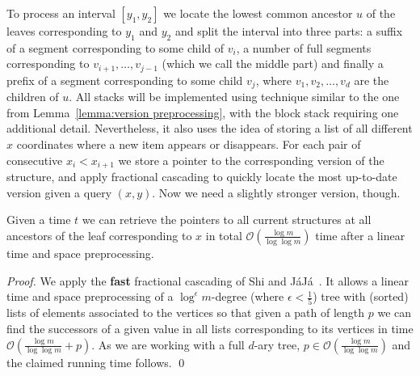 \documentclass[runningheads]{llncs}
\begin{document}
To process an interval $[y_{1},y_{2}]$ we locate the lowest common ancestor $u$ of the leaves corresponding to $y_{1}$ and $y_{2}$ and split the interval into three parts: a suffix of a segment corresponding to some child of $v_{i}$, a number of full segments corresponding to $v_{i+1},\ldots,v_{j-1}$ (which we call the middle part) and finally a prefix of a segment corresponding to some child $v_{j}$, where $v_{1},v_{2},\ldots,v_{d}$ are the children of $u$.
All stacks will be implemented using technique similar to the one from Lemma~\ref{lemma:version preprocessing}, with the block stack requiring one additional detail. Nevertheless, it also uses the idea of storing a list of all different $x$ coordinates where a new item appears or disappears. For each pair of consecutive $x_{i}<x_{i+1}$ we store a pointer to the corresponding version of the structure, and apply fractional cascading to quickly locate the most up-to-date version given a query $(x,y)$. Now we need a slightly stronger version, though.

\begin{lemma}\label{lemma:fast cascading}
Given a time $t$ we can retrieve the pointers to all current structures at all ancestors of the leaf corresponding to $x$ in total $\mathcal{O}(\frac{\log m}{\log\log m})$ time after a linear time and space preprocessing.
\end{lemma}

\begin{proof}
We apply the {\bf fast} fractional cascading of Shi and  J{\'a}J{\'a}~\cite{Jaja}. It allows a linear time and space preprocessing of a $\log^{\epsilon}m$-degree (where $\epsilon<\frac{1}{5}$) tree with (sorted) lists of elements associated to the vertices so that given a path of length $p$ we can find the successors of a given value in all lists corresponding to its vertices in time $\mathcal{O}(\frac{\log m}{\log\log m}+p)$. As we are working with a full $d$-ary tree, $p\in\mathcal{O}(\frac{\log m}{\log\log m})$ and the claimed running time follows.
\qed
\end{proof}
\end{document}
